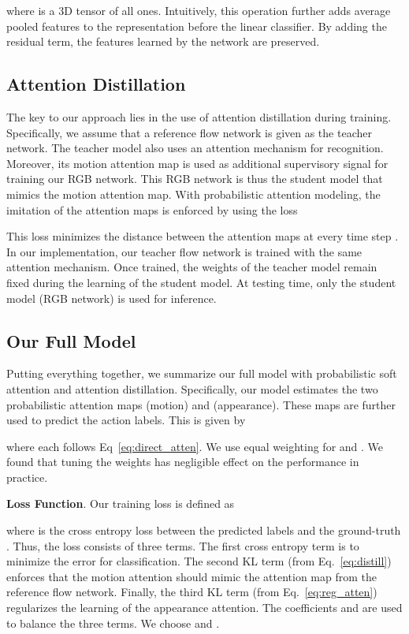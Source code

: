 \documentclass{bmvc2k}
\begin{document}
where  is a 3D tensor of all ones. Intuitively, this operation further adds average pooled features to the representation before the linear classifier. By adding the residual term, the features learned by the network are preserved. 

\subsection{Attention Distillation}
The key to our approach lies in the use of attention distillation during training. Specifically, we assume that a reference flow network is given as the teacher network. The teacher model also uses an attention mechanism for recognition. Moreover, its motion attention map  is used as additional supervisory signal for training our RGB network. This RGB network is thus the student model that mimics the motion attention map. With probabilistic attention modeling, the imitation of the attention maps is enforced by using the loss

This loss minimizes the distance between the attention maps at every time step . In our implementation, our teacher flow network is trained with the same attention mechanism. Once trained, the weights of the teacher model remain fixed during the learning of the student model. At testing time, only the student model (RGB network) is used for inference. 

\subsection{Our Full Model}
Putting everything together, we summarize our full model with probabilistic soft attention and attention distillation. Specifically, our model estimates the two probabilistic attention maps  (motion) and  (appearance). These maps are further used to predict the action labels. This is given by 

where each  follows Eq~\ref{eq:direct_atten}. We use equal weighting for  and . We found that tuning the weights has negligible effect on the performance in practice.

\noindent \textbf{Loss Function}. Our training loss is defined as

where  is the cross entropy loss between the predicted labels  and the ground-truth . Thus, the loss consists of three terms. The first cross entropy term is to minimize the error for classification. The second KL term (from Eq.\ \ref{eq:distill}) enforces that the motion attention  should mimic the attention map  from the reference flow network. Finally, the third KL term (from Eq.\ \ref{eq:reg_atten}) regularizes the learning of the appearance attention. The coefficients  and  are used to balance the three terms. We choose   and .
\end{document}

